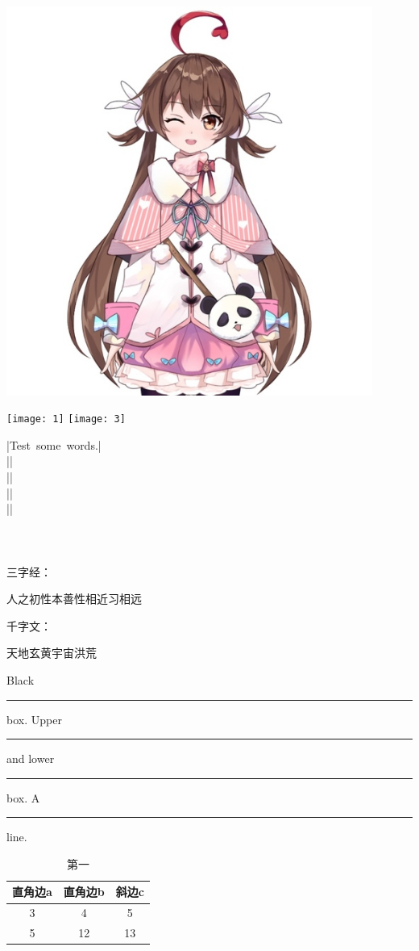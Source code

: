 \documentclass{book}
\begin{document}
		\newpage
		\includegraphics[width=12cm]{2}
        \graphicspath{{D:/study/LaTeXandMdandHTML/LaTexWorkspace/short-zn/Image/}}
        \texttt{[image: 1]}
        \texttt{[image: 3]}
        
        
        |\mbox{Test some words.}|\\
        ||\\
        ||\\
        ||\\
        ||\\
        \\
        \\
        \setlength{\fboxrule}{1.6pt}	%
        \setlength{\fboxsep}{1em}		%
        \\
        三字经：\parbox[t]{3em}%
        {人之初性本善性相近习相远}
        \quad
        千字文：
        \begin{minipage}[b][8ex][t]{4em}
        天地玄黄宇宙洪荒
        \end{minipage}
        Black \rule{12pt}{4pt} box.
        Upper \rule[4pt]{6pt}{8pt} and
        lower \rule[-4pt]{6pt}{8pt} box.
        A \rule[-.4pt]{3em}{.4pt} line.
        
        
        \begin{table}[h]
        	\centering
        	\begin{tabular}{|c|c|c|}
        		\hline
        		直角边a&直角边b&斜边c\\
        		\hline
        		3&4&5\\
        		5&12&13\\
        		\hline
        	\end{tabular}
        	\caption{第一}
        \end{table}
\end{document}
